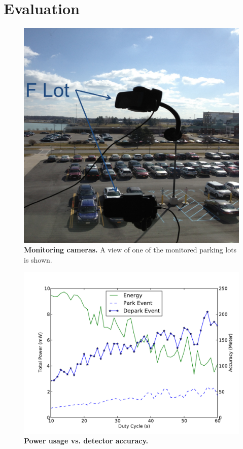 \section{Evaluation}
\label{sec-evaluation}


\begin{figure}
\centering
\includegraphics[width=\columnwidth]{./figures/Camera_setting.pdf}

\caption{\textbf{Monitoring cameras.} A view of one of the monitored parking
lots is shown.}

\label{fig-camera}
\end{figure}

\begin{figure}
\centering
\includegraphics[width=\columnwidth]{./figures/Energy_accuracy.pdf}

\caption{\textbf{Power usage vs. detector accuracy.} }

\label{fig-energy}
\end{figure}

